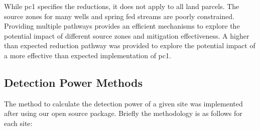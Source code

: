 While \gls{pc1} specifies the reductions, it does not apply to all land parcels. The source zones for many wells and spring fed streams are poorly constrained. Providing multiple pathways provides an efficient mechanisms to explore the potential impact of different source zones and mitigation effectiveness. A higher than expected reduction pathway was provided to explore the potential impact of a more effective than expected implementation of \gls{pc1}.

\subsection[Detection Power Methods] {Detection Power Methods} \label{subsec:detection_power_methods}

The method to calculate the detection power of a given site was implemented after %
using our open source package. %
Briefly the methodology is as follows for each site:
